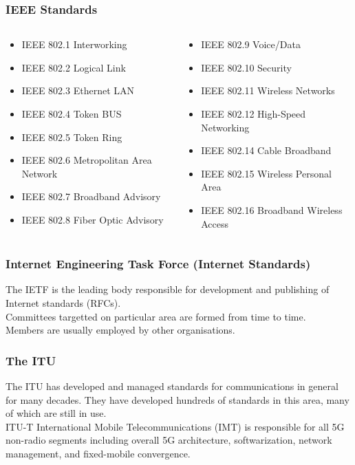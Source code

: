 \documentclass[18pt]{beamer}
\begin{document}
\begin{frame}\LARGE
\frametitle{IEEE Standards}
\begin{columns}
\begin{column}{0.480\textwidth}
\begin{itemize}\large
\item IEEE 802.1 Interworking
\item IEEE 802.2 Logical Link
\item IEEE 802.3 Ethernet LAN
\item IEEE 802.4 Token BUS
\item IEEE 802.5 Token Ring
\item IEEE 802.6 Metropolitan Area Network
\item IEEE 802.7 Broadband Advisory
\item IEEE 802.8 Fiber Optic Advisory
\end{itemize}
\end{column}
\begin{column}{0.460\textwidth}
\begin{itemize}\large
\item IEEE 802.9 Voice/Data
\item IEEE 802.10 Security 
\item IEEE 802.11 Wireless Networks
\item IEEE 802.12 High-Speed Networking
\item IEEE 802.14 Cable Broadband
\item IEEE 802.15 Wireless Personal Area
\item IEEE 802.16 Broadband Wireless Access
\end{itemize}
\end{column}
\end{columns}
\end{frame}

\begin{frame}\LARGE
\frametitle{Internet Engineering Task Force (Internet Standards)}
The IETF is the leading body responsible for development and publishing of
Internet standards (RFCs). \\[2mm]
%
Committees targetted on particular area are formed from time to time.\\[2mm]
%
Members are usually employed by other organisations.\\
\end{frame}

\begin{frame}\LARGE
\frametitle{The ITU}
\large
The ITU has developed and managed standards for communications in general
for many decades. They have developed hundreds of standards in this area, many
of which are still in use.\\[2mm]
%
ITU-T International Mobile Telecommunications (IMT) is responsible for all 5G non-radio
segments including overall 5G architecture, softwarization,
network management, and fixed-mobile convergence.
\end{frame}
\end{document}
